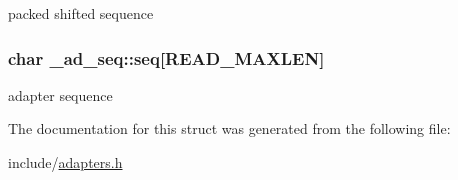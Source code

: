 packed shifted sequence \hypertarget{struct__ad__seq_ad8ea16c086e40f863d19754edab9d67e}{
\subsubsection[{seq}]{\setlength{\rightskip}{0pt plus 5cm}char \+\_\+ad\+\_\+seq\+::seq\mbox{[}R\+E\+A\+D\+\_\+\+M\+A\+X\+L\+E\+N\mbox{]}}}\label{struct__ad__seq_ad8ea16c086e40f863d19754edab9d67e}
adapter sequence 

The documentation for this struct was generated from the following file\+:\begin{DoxyCompactItemize}
\item 
include/\hyperlink{adapters_8h}{adapters.\+h}\end{DoxyCompactItemize}
